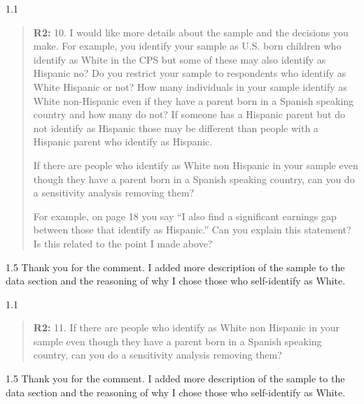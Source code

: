 \documentclass[12pt,english]{article}
\newcommand{\rrquote}{1.1}
\newcommand{\rrxspc}{1.5}
\begin{document}
\begin{refsection}
    \begin{spacing}{\rrquote}
        \begin{quotation}
        \textbf{R2: } 10. I would like more details about the sample and the decisions you make. For example, you identify your sample as U.S. born children who identify as White in the CPS but some of these may also identify as Hispanic no? Do you restrict your sample to respondents who identify as White Hispanic or not? How many individuals in your sample identify as White non-Hispanic even if they have a parent born in a Spanish speaking country and how many do not? If someone has a Hispanic parent but do not identify as Hispanic those may be different than people with a Hispanic parent who identify as Hispanic.
        
        If there are people who identify as White non Hispanic in your sample even though they have a parent born in a Spanish speaking country, can you do a sensitivity analysis removing them?

        For example, on page 18 you say “I also find a significant earnings gap between those that identify as Hispanic.” Can you explain this statement? Is this related to the point I made above?

        \end{quotation}
        \end{spacing}
        
        \begin{spacing}{\rrxspc}
            Thank you for the comment. I added more description of the sample to the data section and the reasoning of why I chose those who self-identify as White. 
    \end{spacing}

    \begin{spacing}{\rrquote}
        \begin{quotation}
        \textbf{R2: } 11. If there are people who identify as White non Hispanic in your sample even though they have a parent born in a Spanish speaking country, can you do a sensitivity analysis removing them?

        \end{quotation}
        \end{spacing}
        
        \begin{spacing}{\rrxspc}
            Thank you for the comment. I added more description of the sample to the data section and the reasoning of why I chose those who self-identify as White. 
    \end{spacing}


\end{refsection}
\end{document}
